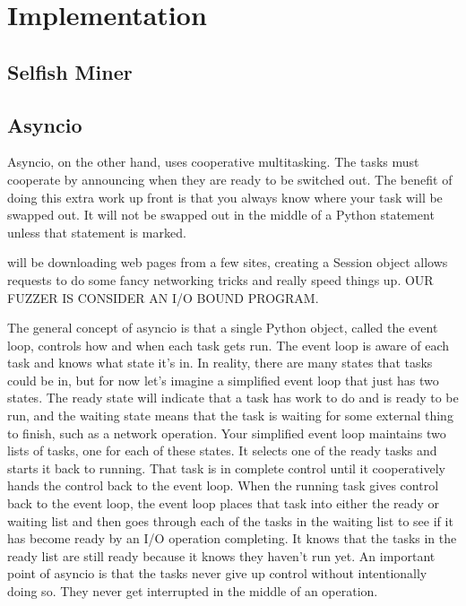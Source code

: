 \chapter{Implementation}
\label{sec:implementation}
\minitoc
\vspace*{1cm}

\section{Selfish Miner}

\section{Asyncio}

 
Asyncio, on the other hand, uses cooperative multitasking. The tasks must cooperate by announcing when they are ready to be switched out. The benefit of doing this extra work up front is that you always know where your task will be swapped out.
It will not be swapped out in the middle of a Python statement unless that statement is marked. 

will be downloading web pages from a few sites, creating a Session object allows requests to do some fancy networking tricks and really speed things up.
 OUR FUZZER IS CONSIDER AN I/O BOUND PROGRAM.
 
 The general concept of asyncio is that a single Python object, called the event loop, controls how and when each task gets run. The event loop is aware of each task and knows what state it's in. In reality, there are many states that tasks could be in, but for now let's imagine a simplified event loop that just has two states. The ready state will indicate that a task has work to do and is ready to be run, and the waiting state means that the task is waiting for some external thing to finish, such as a network operation. Your simplified event loop maintains two lists of tasks, one for each of these states. It selects one of the ready tasks and starts it back to running. That task is in complete control until it cooperatively hands the control back to the event loop. When the running task gives control back to the event loop, the event loop places that task into either the ready or waiting list and then goes through each of the tasks in the waiting list to see if it has become ready by an I/O operation completing. It knows that the tasks in the ready list are still ready because it knows they haven't run yet. An important point of asyncio is that the tasks never give up control without intentionally doing so. They never get interrupted in the middle of an operation. 
 
